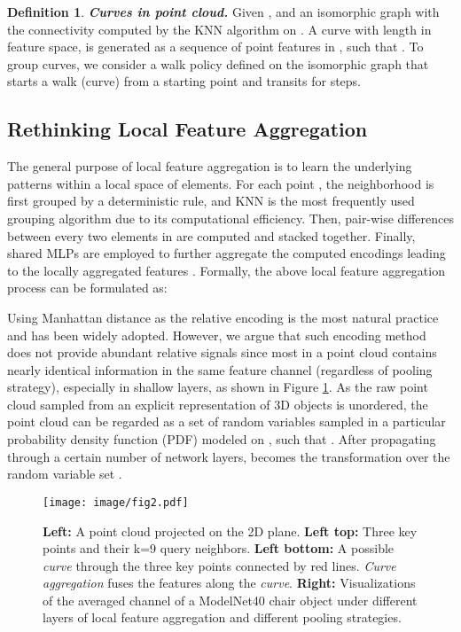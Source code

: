 \documentclass[10pt,twocolumn,letterpaper]{article}
\theoremstyle{definition}
\newtheorem{definition}{Definition}[]
\begin{document}
\begin{definition}
\textit{\textbf{Curves in point cloud.}} Given ,  and an isomorphic graph  with the connectivity  computed by the KNN algorithm on . A curve  with length  in feature space, is generated as a sequence of point features in , such that . To group curves, we consider a walk policy  defined on the isomorphic graph  that starts a walk (curve) from a starting point  and transits for  steps. 
\end{definition}






\subsection{Rethinking Local Feature Aggregation} \label{rethink}

The general purpose of local feature aggregation is to learn the underlying patterns within a local space of  elements. For each point , the neighborhood  is first grouped by a deterministic rule, and KNN is the most frequently used grouping algorithm \cite{hu2020randla,yan2020pointasnl,liu2020closer,zhang2020shape} due to its computational efficiency. Then, pair-wise differences  between every two elements in  are computed and stacked together. Finally, shared MLPs are employed to further aggregate the computed encodings leading to the locally aggregated features . Formally, the above local feature aggregation process can be formulated as:


Using Manhattan distance  as the relative encoding is the most natural practice and has been widely adopted. However, we argue that such encoding method does not provide abundant relative signals since most  in a point cloud contains nearly identical information in the same feature channel (regardless of pooling strategy), especially in shallow layers, as shown in Figure \ref{fig:2}. As the raw point cloud sampled from an explicit representation  of 3D objects is unordered, the point cloud  can be regarded as a set of random variables sampled in a particular probability density function (PDF)  modeled on , such that . 
After propagating through a certain number of network layers,  becomes the transformation over the random variable set .

\begin{figure}[t]
	\begin{center}
\texttt{[image: image/fig2.pdf]}
	\end{center}
	\caption{\textbf{Left:} A point cloud projected on the 2D plane. \textbf{Left top:} Three key points and their k=9 query neighbors. \textbf{Left bottom:} A possible \textit{curve} through the three key points connected by red lines. \textit{Curve aggregation} fuses the features along the \textit{curve}. \textbf{Right:} Visualizations of the averaged channel  of a ModelNet40 chair object under different layers of local feature aggregation and different pooling strategies.}
	\label{fig:2}
\end{figure}
\end{document}
